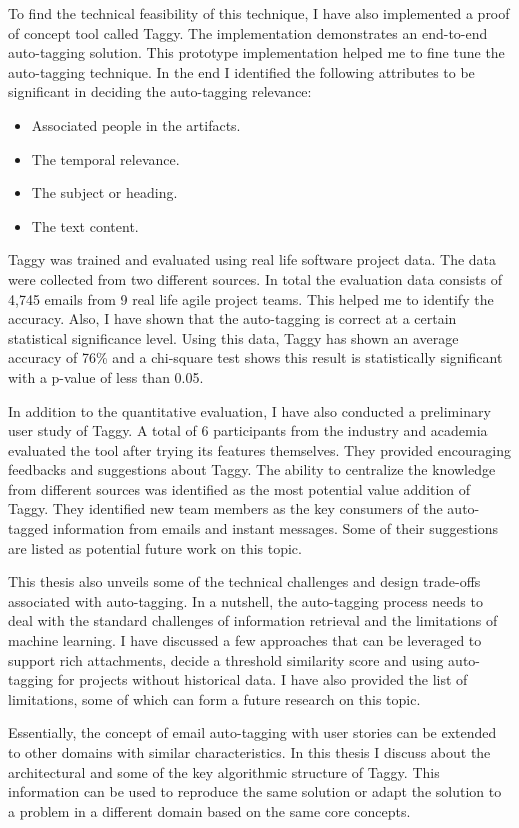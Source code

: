 To find the technical feasibility of this technique, I have also implemented a proof of concept tool called Taggy. The implementation demonstrates an end-to-end auto-tagging solution. This prototype implementation helped me to fine tune the auto-tagging technique. In the end I identified the following attributes to be significant in deciding the auto-tagging relevance:
\begin{itemize}
	\item Associated people in the artifacts.
	\item The temporal relevance.
	\item The subject or heading.
	\item The text content.	
\end{itemize}

Taggy was trained and evaluated using real life software project data. The data were collected from two different sources. In total the evaluation data consists of 4,745 emails from 9 real life agile project teams.  This helped me to identify the accuracy. Also, I have shown that the auto-tagging is correct at a certain statistical significance level. Using this data, Taggy has shown an average accuracy of 76\% and a chi-square test shows this result is statistically significant with a p-value of less than 0.05.

In addition to the quantitative evaluation, I have also conducted a preliminary user study of Taggy. A total of 6 participants from the industry and academia evaluated the tool after trying its features themselves. They provided encouraging feedbacks and suggestions about Taggy. The ability to centralize the knowledge from different sources was identified as the most potential value addition of Taggy. They identified new team members as the key consumers of the auto-tagged information from emails and instant messages. Some of their suggestions are listed as potential future work on this topic.

This thesis also unveils some of the technical challenges and design trade-offs associated with auto-tagging. In a nutshell, the auto-tagging process needs to deal with the standard challenges of information retrieval and the limitations of machine learning. I have discussed a few approaches that can be leveraged to support rich attachments, decide a threshold similarity score and using auto-tagging for projects without historical data. I have also provided the list of limitations, some of which can form a future research on this topic.

Essentially, the concept of email auto-tagging with user stories can be extended to other domains with similar characteristics. In this thesis I discuss about the architectural and some of the key algorithmic structure of Taggy. This information can be used to reproduce the same solution or adapt the solution to a problem in a different domain based on the same core concepts.

